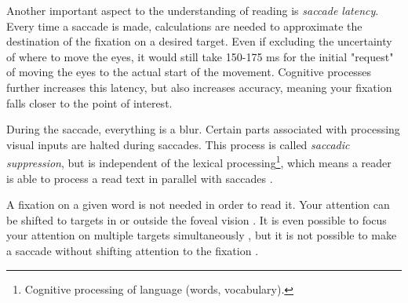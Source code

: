 Another important aspect to the understanding of reading is \textit{saccade latency}. Every time a saccade is made, calculations are needed to approximate the destination of the fixation on a desired target. Even if excluding the uncertainty of where to move the eyes, it would still take 150-175 ms for the initial "request" of moving the eyes to the actual start of the movement. Cognitive processes further increases this latency, but also increases accuracy, meaning your fixation falls closer to the point of interest.


During the saccade, everything is a blur. Certain parts associated with processing visual inputs are halted during saccades. This process is called \textit{saccadic suppression}, but is independent of the lexical processing\footnote{Cognitive processing of language (words, vocabulary).}, which means a reader is able to process a read text in parallel with saccades \cite{eyeMovement}.

A fixation on a given word is not needed in order to read it. Your attention can be shifted to targets in or outside the foveal vision \cite{eyeMovement}. It is even possible to focus your attention on multiple targets simultaneously \cite{simAttention}, but it is not possible to make a saccade without shifting attention to the fixation \cite{eyeMovement}.